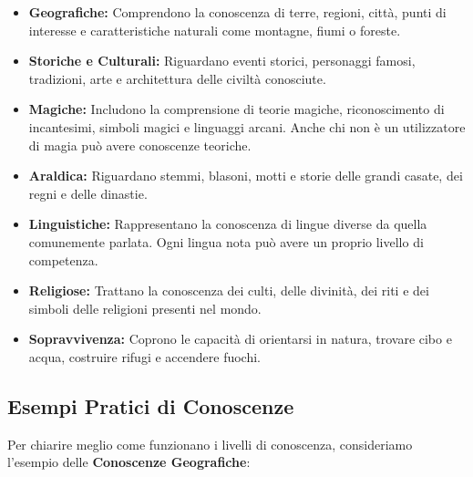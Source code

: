 \documentclass[../manuale_main.tex]{subfiles}
\begin{document}
\begin{itemize}
    \item \textbf{Geografiche:} Comprendono la conoscenza di terre, regioni, città, punti di interesse e caratteristiche naturali come montagne, fiumi o foreste.
    
    \item \textbf{Storiche e Culturali:} Riguardano eventi storici, personaggi famosi, tradizioni, arte e architettura delle civiltà conosciute.
    
    \item \textbf{Magiche:} Includono la comprensione di teorie magiche, riconoscimento di incantesimi, simboli magici e linguaggi arcani. Anche chi non è un utilizzatore di magia può avere conoscenze teoriche.
    
    \item \textbf{Araldica:} Riguardano stemmi, blasoni, motti e storie delle grandi casate, dei regni e delle dinastie.
    
    \item \textbf{Linguistiche:} Rappresentano la conoscenza di lingue diverse da quella comunemente parlata. Ogni lingua nota può avere un proprio livello di competenza.
    
    \item \textbf{Religiose:} Trattano la conoscenza dei culti, delle divinità, dei riti e dei simboli delle religioni presenti nel mondo.
    
    \item \textbf{Sopravvivenza:} Coprono le capacità di orientarsi in natura, trovare cibo e acqua, costruire rifugi e accendere fuochi.
\end{itemize}

\vspace{0.3cm}

\subsection{Esempi Pratici di Conoscenze}
Per chiarire meglio come funzionano i livelli di conoscenza, consideriamo l’esempio delle \textbf{Conoscenze Geografiche}:
\end{document}
